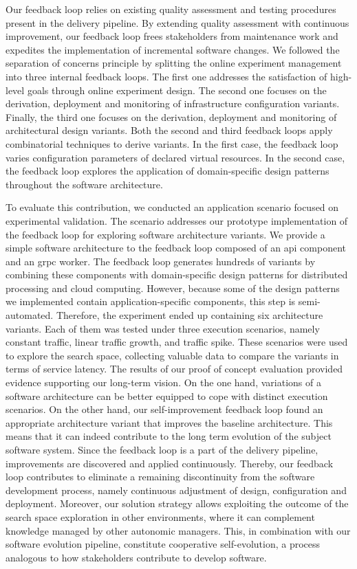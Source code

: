 \begin{description}[style=unboxed,leftmargin=0cm,font=\bfseries\normalsize]
	Our feedback loop relies on existing quality assessment and testing procedures present in the delivery pipeline. By extending quality assessment with continuous improvement, our feedback loop frees stakeholders from maintenance work and expedites the implementation of incremental software changes. We followed the separation of concerns principle by splitting the online experiment management into three internal feedback loops. The first one addresses the satisfaction of high-level goals through online experiment design. The second one focuses on the derivation, deployment and monitoring of infrastructure configuration variants. Finally, the third one focuses on the derivation, deployment and monitoring of architectural design variants. Both the second and third feedback loops apply combinatorial techniques to derive variants. In the first case, the feedback loop varies configuration parameters of declared virtual resources. In the second case, the feedback loop explores the application of domain-specific design patterns throughout the software architecture.

	To evaluate this contribution, we conducted an application scenario focused on experimental validation. The scenario addresses our prototype implementation of the feedback loop for exploring software architecture variants. We provide a simple software architecture to the feedback loop composed of an \gls{api} component and an \acrshort{grpc} worker. The feedback loop generates hundreds of variants by combining these components with domain-specific design patterns for distributed processing and cloud computing. However, because some of the design patterns we implemented contain application-specific components, this step is semi-automated. Therefore, the experiment ended up containing six architecture variants. Each of them was tested under three execution scenarios, namely constant traffic, linear traffic growth, and traffic spike. These scenarios were used to explore the search space, collecting valuable data to compare the variants in terms of service latency. The results of our proof of concept evaluation provided evidence supporting our long-term vision. On the one hand, variations of a software architecture can be better equipped to cope with distinct execution scenarios. On the other hand, our self-improvement feedback loop found an appropriate architecture variant that improves the baseline architecture. This means that it can indeed contribute to the long term evolution of the subject software system. Since the feedback loop is a part of the delivery pipeline, improvements are discovered and applied continuously. Thereby, our feedback loop contributes to eliminate a remaining discontinuity from the software development process, namely continuous adjustment of design, configuration and deployment. Moreover, our solution strategy allows exploiting the outcome of the search space exploration in other environments, where it can complement knowledge managed by other autonomic managers. This, in combination with our software evolution pipeline, constitute cooperative self-evolution, a process analogous to how stakeholders contribute to develop software.
	

\end{description}
